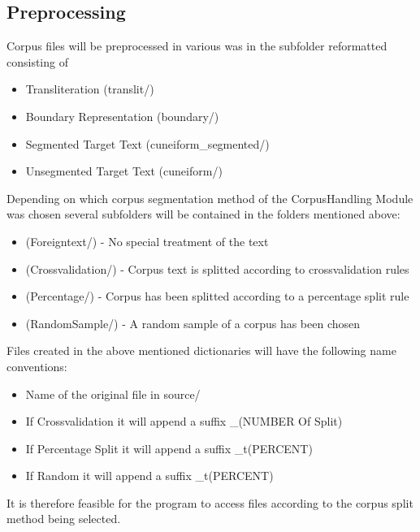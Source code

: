 \documentclass[10pt,a4paper,titlepage]{report}
\begin{document}
	\subsection{Preprocessing}
	Corpus files will be preprocessed in various was in the subfolder reformatted consisting of 
	\begin{itemize}
		\item Transliteration (translit/)
		\item Boundary Representation (boundary/)
		\item Segmented Target Text (cuneiform\_segmented/)
		\item Unsegmented Target Text (cuneiform/)
	\end{itemize}
	Depending on which corpus segmentation method of the CorpusHandling Module was chosen several subfolders will be contained in the folders mentioned above:
	\begin{itemize}
		\item (Foreigntext/) - No special treatment of the text
		\item (Crossvalidation/) - Corpus text is splitted according to crossvalidation rules
		\item (Percentage/) - Corpus has been splitted according to a percentage split rule
		\item (RandomSample/) - A random sample of a corpus has been chosen
	\end{itemize}
	Files created in the above mentioned dictionaries will have the following name conventions:
	\begin{itemize}
		\item Name of the original file in source/
		\item If Crossvalidation it will append a suffix \_(NUMBER Of Split)
		\item If Percentage Split it will append a suffix \_t(PERCENT)
		\item If Random it will append a suffix \_t(PERCENT)
	\end{itemize}
	It is therefore feasible for the program to access files according to the corpus split method being selected.
\end{document}
